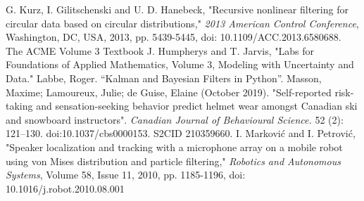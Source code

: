 \documentclass[11pt]{amsart}
\begin{document}
\FloatBarrier %
\newpage


\begin{thebibliography}{99}
 G. Kurz, I. Gilitschenski and U. D. Hanebeck, "Recursive nonlinear filtering for circular data based on circular distributions," \textit{2013 American Control Conference}, Washington, DC, USA, 2013, pp. 5439-5445, doi: 10.1109/ACC.2013.6580688.
 The ACME Volume 3 Textbook
 J. Humpherys and T. Jarvis, "Labs for Foundations of Applied Mathematics, Volume 3, Modeling with Uncertainty and Data."
 Labbe, Roger. “Kalman and Bayesian Filters in Python”.
 Masson, Maxime; Lamoureux, Julie; de Guise, Elaine (October 2019). "Self-reported risk-taking and sensation-seeking behavior predict helmet wear amongst Canadian ski and snowboard instructors". \textit{Canadian Journal of Behavioural Science.} 52 (2): 121–130. doi:10.1037/cbs0000153. S2CID 210359660.
 I. Marković and I. Petrović, "Speaker localization and tracking with a microphone array on a mobile robot using von Mises distribution and particle filtering," \textit{Robotics and Autonomous Systems}, Volume 58, Issue 11, 2010, pp. 1185-1196, doi: 10.1016/j.robot.2010.08.001
\end{thebibliography}
\end{document}
